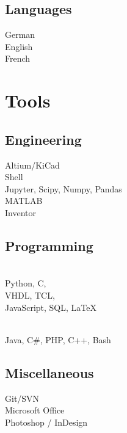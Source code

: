 \documentclass[]{resume}
\begin{document}
\begin{facts}
\subsection{Languages}
German \\
English \\
French 
\sectionsep

\section{Tools}

\subsection{Engineering}
Altium/KiCad\\
Shell\\
Jupyter, Scipy, Numpy, Pandas\\
MATLAB\\
Inventor
\sectionsep

\subsection{Programming}
\\
Python, C,\\
VHDL, TCL,\\
JavaScript, SQL, LaTeX
\sectionsep

\\
Java, C\#, PHP, C++, Bash
\sectionsep

\subsection{Miscellaneous}
Git/SVN\\
Microsoft Office\\
Photoshop / InDesign
\sectionsep

\end{facts}
\end{document}
